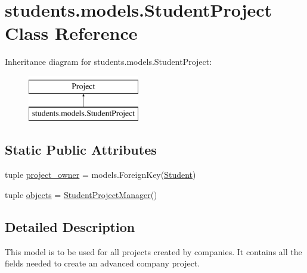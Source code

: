 \hypertarget{classstudents_1_1models_1_1_student_project}{\section{students.\-models.\-Student\-Project Class Reference}
\label{classstudents_1_1models_1_1_student_project}
}
Inheritance diagram for students.\-models.\-Student\-Project\-:\begin{figure}[H]
\begin{center}
\leavevmode
\includegraphics[height=2.000000cm]{classstudents_1_1models_1_1_student_project}
\end{center}
\end{figure}
\subsection*{Static Public Attributes}
\begin{DoxyCompactItemize}
\item 
tuple \hyperlink{classstudents_1_1models_1_1_student_project_a5ba7a623e161f3bc7301273b479c34aa}{project\-\_\-owner} = models.\-Foreign\-Key(\hyperlink{classstudents_1_1models_1_1_student}{Student})
\item 
tuple \hyperlink{classstudents_1_1models_1_1_student_project_ae8b085624144ff16a10d16c43804db51}{objects} = \hyperlink{classstudents_1_1models_1_1_student_project_manager}{Student\-Project\-Manager}()
\end{DoxyCompactItemize}


\subsection{Detailed Description}
\begin{DoxyVerb}This model is to be used for all projects created by companies.
It contains all the fields needed to create an advanced company project.
\end{DoxyVerb}
 

